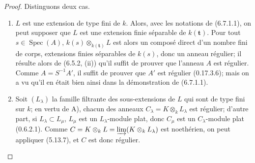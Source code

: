 \begin{proof}
Distinguons deux cas.

\begin{enumerate}
\item[A)] $L$ est une extension de type fini de $k$. Alors, avec les
notations de (6.7.1.1), on peut supposer que $L$ est une extension finie
séparable de $k(\boldsymbol t)$. Pour tout $s\in\operatorname{Spec}(A)$,
$k(s)\otimes_{k(\boldsymbol t)}L$ est alors un composé direct d'un nombre
fini de corps, extensions finies séparables de $k(s)$, donc un anneau
régulier; il résulte alors de (6.5.2, (ii)) qu'il suffit de prouver que
l'anneau $A$ est régulier. Comme $A=S^{-1}A'$, il suffit de prouver que
$A'$ est régulier (0.17.3.6); mais on a vu qu'il en était bien ainsi dans
la démonstration de (6.7.1.1).
\item[B)] Soit $(L_\lambda)$ la famille filtrante des sous-extensions de
$L$ qui sont de type fini sur $k$; en vertu de A), chacun des anneaux
$C_\lambda=K\otimes_kL_\lambda$ est régulier; d'autre part, si
$L_\lambda\subset L_\mu$, $L_\mu$ est un $L_\lambda$-module plat, donc
$C_\mu$ est un $C_\lambda$-module plat (0.6.2.1). Comme
$C=K\otimes_kL=\varinjlim(K\otimes_kL_\lambda)$ est noethérien, on peut
appliquer (5.13.7), et $C$ est donc régulier.
\end{enumerate}
\end{proof}

